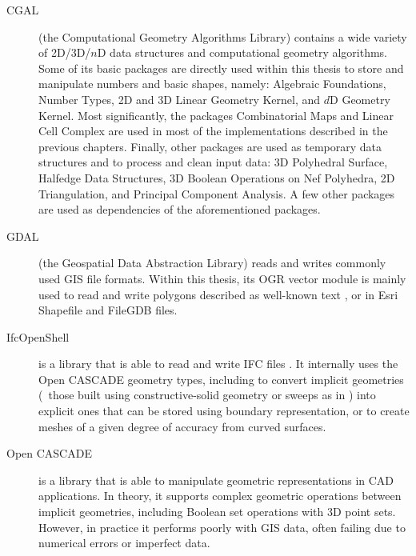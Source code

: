 \begin{description}

\item[CGAL\footnotemark]
(the Computational Geometry Algorithms Library) contains a wide variety of 2D/3D/$n$D data structures and computational geometry algorithms.
Some of its basic packages are directly used within this thesis to store and manipulate numbers and basic shapes, namely: Algebraic Foundations, Number Types, 2D and 3D Linear Geometry Kernel, and $d$D Geometry Kernel.
Most significantly, the packages Combinatorial Maps and Linear Cell Complex are used in most of the implementations described in the previous chapters.
Finally, other packages are used as temporary data structures and to process and clean input data: 3D Polyhedral Surface, Halfedge Data Structures, 3D Boolean Operations on Nef Polyhedra, 2D Triangulation, and Principal Component Analysis.
A few other packages are used as dependencies of the aforementioned packages.

\item[GDAL\footnotemark]
(the Geospatial Data Abstraction Library) reads and writes commonly used GIS file formats.
Within this thesis, its OGR vector module is mainly used to read and write polygons described as well-known text \citep{SimpleFeatures1}, or in Esri Shapefile \citep{Shapefile} and FileGDB files.

\item[IfcOpenShell\footnotemark]
is a library that is able to read and write IFC files \citep{ISO16739:2013}.
It internally uses the Open CASCADE geometry types, including to convert implicit geometries (\eg\ those built using constructive-solid geometry or sweeps as in ) into explicit ones that can be stored using boundary representation, or to create meshes of a given degree of accuracy from curved surfaces.

\item[Open CASCADE\footnotemark]
is a library that is able to manipulate geometric representations in CAD applications.
In theory, it supports complex geometric operations between implicit geometries, including Boolean set operations with 3D point sets.
However, in practice it performs poorly with GIS data, often failing due to numerical errors or imperfect data.

\end{description}

